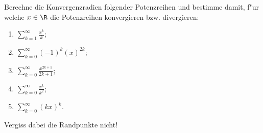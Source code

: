 \begin{prob}
Berechne die Konvergenzradien folgender Potenzreihen und bestimme damit, f"ur welche $x\in\R$ die Potenzreihen konvergieren bzw. divergieren:
\begin{enumerate}[label=(\alph*)]
\item $\sum_{k=1}^\infty \frac{x^k}{k}$;
\item $\sum_{k=0}^\infty (-1)^k(x)^{2k}$;
\item $\sum_{k=0}^\infty \frac{x^{2k+1}}{2k+1}$;
\item $\sum_{k=0}^\infty \frac{x^k}{k^2}$;
\item $\sum_{k=0}^\infty (kx)^k$.
\end{enumerate} 
Vergiss dabei die Randpunkte nicht!
\end{prob}
